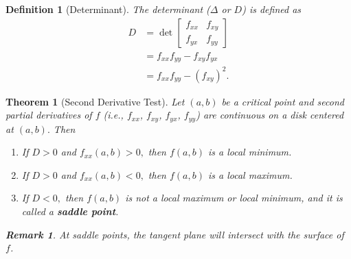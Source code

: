 \documentclass[12pt,a4paper]{article}
\newtheorem{thm}{Theorem}[subsection]
\newtheorem{df}{Definition}[subsection]
\newtheorem*{rmk}{\indent Remark}
\begin{document}
\begin{df}[Determinant]
	The determinant ($\Delta$ or $D$) is defined as \[\begin{aligned}D&=\det\begin{bmatrix}f_{xx}&f_{xy}\\f_{yx}&f_{yy}\end{bmatrix}\\&=f_{xx}f_{yy}-f_{xy}f_{yx}\\&=f_{xx}f_{yy}-(f_{xy})^2.\end{aligned}\] 	
\end{df}
\begin{thm}[Second Derivative Test]
	Let $(a,b)$ be a critical point and second partial derivatives of $f$ (i.e., $f_{xx}$, $f_{xy}$, $f_{yx}$, $f_{yy}$) are continuous on a disk centered at $(a,b).$ Then \begin{enumerate}
		\item If $D>0$ and $f_{xx}(a,b)>0,$ then $f(a,b)$ is a local minimum.
		\item If $D>0$ and $f_{xx}(a,b)<0,$ then $f(a,b)$ is a local maximum. 
		\item If $D<0,$ then $f(a,b)$ is not a local maximum or local minimum, and it is called a \textbf{saddle point}.
	\end{enumerate}	
	\begin{rmk} At saddle points, the tangent plane will intersect with the surface of $f$. \end{rmk}
\end{thm}
\end{document}
